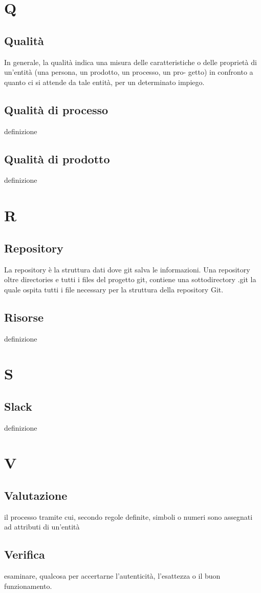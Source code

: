 \documentclass[11pt,a4paper]{article}
\begin{document}
	\section{Q}
	\subsection{Qualità}
	In generale, la qualità indica una misura delle caratteristiche o
delle proprietà di un’entità (una persona, un prodotto, un processo, un pro-
getto) in confronto a quanto ci si attende da tale entità, per un determinato
impiego.
	\subsection{Qualità di processo}
	definizione
	\subsection{Qualità di prodotto}
	definizione
	\section{R}
	\subsection{Repository}
	La repository è la struttura dati dove git salva le informazioni. Una repository oltre directories e tutti i files del progetto git, contiene una sottodirectory .git la quale ospita tutti i file necessary per la struttura della repository Git.
	\subsection{Risorse}
	definizione
	\section{S}
	\subsection{Slack}
	definizione
	\section{V}
	\subsection{Valutazione}
	il processo tramite cui, secondo regole definite, simboli o numeri sono assegnati ad attributi di un’entità
	\subsection{Verifica}
	esaminare, qualcosa per accertarne l’autenticità, l’esattezza o il buon funzionamento.
\end{document}

